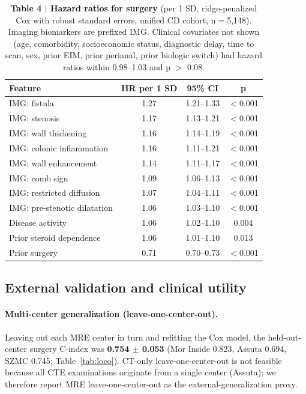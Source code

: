 \documentclass[11pt]{article}
\begin{document}
\begin{table}[htbp]
\centering
\caption{\textbf{Table 4 $\vert$ Hazard ratios for surgery} (per 1 SD, ridge-penalized Cox with robust
standard errors, unified CD cohort, n$=$5,148). Imaging biomarkers are prefixed IMG. Clinical covariates
not shown (age, comorbidity, socioeconomic status, diagnostic delay, time to scan, sex, prior EIM, prior
perianal, prior biologic switch) had hazard ratios within 0.98--1.03 and p $>$ 0.08.}
\label{tab:hr}
\begin{tabular}{lccc}
\toprule
\textbf{Feature} & \textbf{HR per 1 SD} & \textbf{95\% CI} & \textbf{p} \\
\midrule
IMG: fistula                 & 1.27 & 1.21--1.33 & $<$0.001 \\
IMG: stenosis                & 1.17 & 1.13--1.21 & $<$0.001 \\
IMG: wall thickening         & 1.16 & 1.14--1.19 & $<$0.001 \\
IMG: colonic inflammation    & 1.16 & 1.11--1.21 & $<$0.001 \\
IMG: wall enhancement        & 1.14 & 1.11--1.17 & $<$0.001 \\
IMG: comb sign               & 1.09 & 1.06--1.13 & $<$0.001 \\
IMG: restricted diffusion    & 1.07 & 1.04--1.11 & $<$0.001 \\
IMG: pre-stenotic dilatation & 1.06 & 1.03--1.10 & $<$0.001 \\
Disease activity             & 1.06 & 1.02--1.10 & 0.004 \\
Prior steroid dependence     & 1.06 & 1.01--1.10 & 0.013 \\
Prior surgery                & 0.71 & 0.70--0.73 & $<$0.001 \\
\bottomrule
\end{tabular}
\end{table}

\subsection*{External validation and clinical utility}

\paragraph{Multi-center generalization (leave-one-center-out).}
Leaving out each MRE center in turn and refitting the Cox model, the held-out-center surgery C-index
was \textbf{0.754 $\pm$ 0.053} (Mor Inside 0.823, Assuta 0.694, SZMC 0.745; Table~\ref{tab:loco}).
CT-only leave-one-center-out is not feasible because all CTE examinations originate from a single
center (Assuta); we therefore report MRE leave-one-center-out as the external-generalization proxy.
\end{document}
